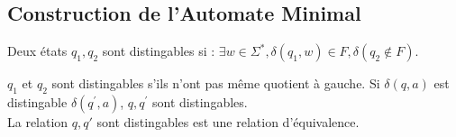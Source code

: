 \documentclass{cours}
\begin{document}
\subsection{Construction de l'Automate Minimal}
\begin{definition}
    Deux états $q_{1}, q_{2}$ sont distingables si : $\exists w \in \Sigma^{*}, \delta(q_{1}, w) \in F, \delta(q_{2} \notin F)$. 
\end{definition}
\begin{proposition}
    $q_{1}$ et $q_{2}$ sont distingables s'ils n'ont pas même quotient à gauche. Si $\delta(q, a)$ est distingable $\delta(q^{'}, a)$, $q, q^{'}$ sont distingables.\\
    La relation $q, q'$ sont distingables est une relation d'équivalence. 
\end{proposition}
\end{document}
